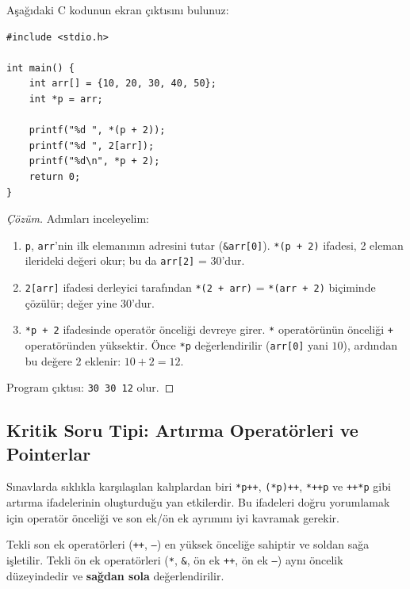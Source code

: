 \begin{example}
Aşağıdaki C kodunun ekran çıktısını bulunuz:
\begin{lstlisting}[language=CTemel]
#include <stdio.h>

int main() {
    int arr[] = {10, 20, 30, 40, 50};
    int *p = arr;
    
    printf("%d ", *(p + 2));
    printf("%d ", 2[arr]);
    printf("%d\n", *p + 2);
    return 0;
}
\end{lstlisting}
\end{example}

\begin{proof}[Çözüm]
Adımları inceleyelim:
\begin{enumerate}
    \item \texttt{p}, \texttt{arr}'nin ilk elemanının adresini tutar (\texttt{\&arr[0]}). \texttt{*(p + 2)} ifadesi, 2 eleman ilerideki değeri okur; bu da \texttt{arr[2]} = $30$'dur.
    \item \texttt{2[arr]} ifadesi derleyici tarafından \texttt{*(2 + arr)} = \texttt{*(arr + 2)} biçiminde çözülür; değer yine $30$'dur.
    \item \texttt{*p + 2} ifadesinde operatör önceliği devreye girer. \texttt{*} operatörünün önceliği \texttt{+} operatöründen yüksektir. Önce \texttt{*p} değerlendirilir (\texttt{arr[0]} yani $10$), ardından bu değere $2$ eklenir: $10 + 2 = 12$.
\end{enumerate}
Program çıktısı: \texttt{30 30 12} olur.
\end{proof}

\subsection{Kritik Soru Tipi: Artırma Operatörleri ve Pointerlar}

Sınavlarda sıklıkla karşılaşılan kalıplardan biri \texttt{*p++}, \texttt{(*p)++}, \texttt{*++p} ve \texttt{++*p} gibi artırma ifadelerinin oluşturduğu yan etkilerdir. Bu ifadeleri doğru yorumlamak için operatör önceliği ve son ek/ön ek ayrımını iyi kavramak gerekir.

\begin{definition}
Tekli son ek operatörleri (\texttt{++}, \texttt{--}) en yüksek önceliğe sahiptir ve soldan sağa işletilir.
Tekli ön ek operatörleri (\texttt{*}, \texttt{\&}, ön ek \texttt{++}, ön ek \texttt{--}) aynı öncelik düzeyindedir ve \textbf{sağdan sola} değerlendirilir.
\end{definition}


